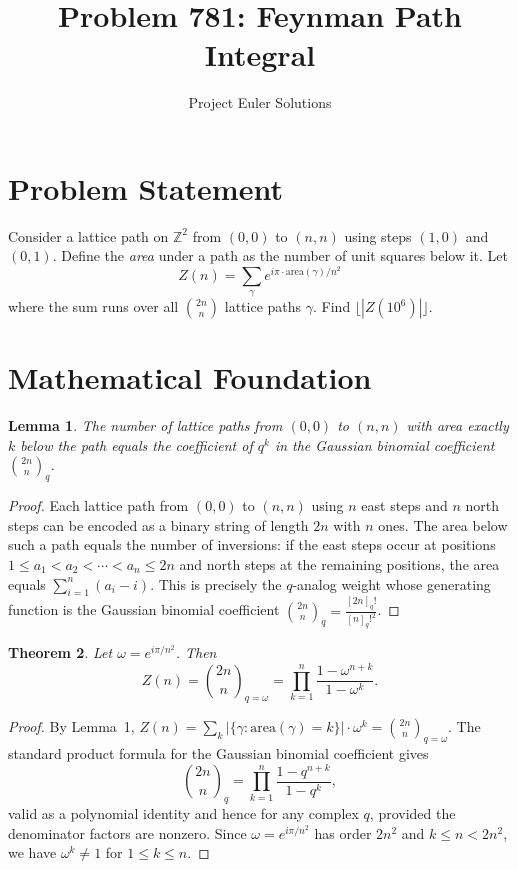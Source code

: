 \documentclass[11pt]{article}
\title{Problem 781: Feynman Path Integral}
\author{Project Euler Solutions}
\date{}
\newtheorem{theorem}{Theorem}
\newtheorem{lemma}[theorem]{Lemma}
\begin{document}
\maketitle

\section{Problem Statement}
Consider a lattice path on $\mathbb{Z}^2$ from $(0,0)$ to $(n,n)$ using steps $(1,0)$ and $(0,1)$. Define the \emph{area} under a path as the number of unit squares below it. Let
\[
Z(n) = \sum_{\gamma} e^{i\pi \cdot \mathrm{area}(\gamma)/n^2}
\]
where the sum runs over all $\binom{2n}{n}$ lattice paths $\gamma$. Find $\lfloor |Z(10^6)| \rfloor$.

\section{Mathematical Foundation}

\begin{lemma}
The number of lattice paths from $(0,0)$ to $(n,n)$ with area exactly $k$ below the path equals the coefficient of $q^k$ in the Gaussian binomial coefficient $\binom{2n}{n}_q$.
\end{lemma}

\begin{proof}
Each lattice path from $(0,0)$ to $(n,n)$ using $n$ east steps and $n$ north steps can be encoded as a binary string of length $2n$ with $n$ ones. The area below such a path equals the number of inversions: if the east steps occur at positions $1 \le a_1 < a_2 < \cdots < a_n \le 2n$ and north steps at the remaining positions, the area equals $\sum_{i=1}^{n}(a_i - i)$. This is precisely the $q$-analog weight whose generating function is the Gaussian binomial coefficient $\binom{2n}{n}_q = \frac{[2n]_q!}{[n]_q!^2}$.
\end{proof}

\begin{theorem}
Let $\omega = e^{i\pi/n^2}$. Then
\[
Z(n) = \binom{2n}{n}_{q=\omega} = \prod_{k=1}^{n} \frac{1 - \omega^{n+k}}{1 - \omega^k}.
\]
\end{theorem}

\begin{proof}
By Lemma~1, $Z(n) = \sum_k |\{\gamma : \mathrm{area}(\gamma)=k\}|\cdot \omega^k = \binom{2n}{n}_{q=\omega}$. The standard product formula for the Gaussian binomial coefficient gives
\[
\binom{2n}{n}_q = \prod_{k=1}^{n}\frac{1-q^{n+k}}{1-q^k},
\]
valid as a polynomial identity and hence for any complex $q$, provided the denominator factors are nonzero. Since $\omega = e^{i\pi/n^2}$ has order $2n^2$ and $k \le n < 2n^2$, we have $\omega^k \ne 1$ for $1 \le k \le n$.
\end{proof}
\end{document}
